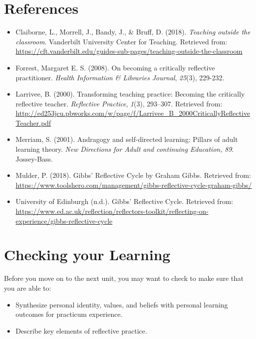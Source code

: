 \documentclass[
]{book}
\providecommand{\tightlist}{%
  \setlength{\itemsep}{0pt}\setlength{\parskip}{0pt}}
\begin{document}
\hypertarget{references-1}{%
\section*{References}\label{references-1}}

\begin{itemize}
\tightlist
\item
  Claiborne, L., Morrell, J., Bandy, J., \& Bruff, D. (2018). \emph{Teaching outside the classroom}. Vanderbilt University Center for Teaching. Retrieved from: \url{https://cft.vanderbilt.edu/guides-sub-pages/teaching-outside-the-classroom}\\
\item
  Forrest, Margaret E. S. (2008). On becoming a critically reflective practitioner. \emph{Health Information \& Libraries Journal}, \emph{25}(3), 229-232.\\
\item
  Larrivee, B. (2000). Transforming teaching practice: Becoming the critically reflective teacher. \emph{Reflective Practice}, \emph{1}(3), 293--307. Retrieved from: \url{http://ed253jcu.pbworks.com/w/page/f/Larrivee_B_2000CriticallyReflectiveTeacher.pdf}\\
\item
  Merriam, S. (2001). Andragogy and self-directed learning: Pillars of adult learning theory. \emph{New Directions for Adult and continuing Education, 89}. Jossey-Bass.\\
\item
  Mulder, P. (2018). Gibbs' Reflective Cycle by Graham Gibbs. Retrieved from: \url{https://www.toolshero.com/management/gibbs-reflective-cycle-graham-gibbs/}\\
\item
  University of Edinburgh (n.d.). Gibbs' Reflective Cycle. Retrieved from: \url{https://www.ed.ac.uk/reflection/reflectors-toolkit/reflecting-on-experience/gibbs-reflective-cycle}
\end{itemize}

\hypertarget{checking-your-learning-1}{%
\section*{Checking your Learning}\label{checking-your-learning-1}}

\begin{progress}
Before you move on to the next unit, you may want to check to make sure that you are able to:

\begin{itemize}
\tightlist
\item
  Synthesize personal identity, values, and beliefs with personal learning outcomes for practicum experience.\\
\item
  Describe key elements of reflective practice.
\end{itemize}
\end{progress}
\end{document}
